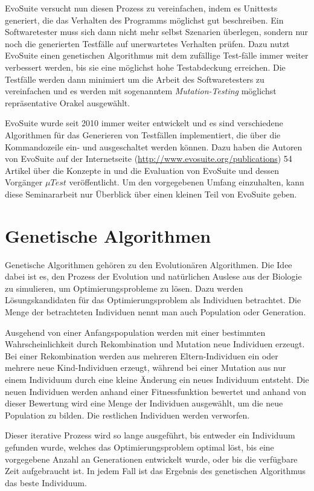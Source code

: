 \documentclass[a4paper,11pt]{article}
\begin{document}
EvoSuite versucht nun diesen Prozess zu vereinfachen, indem es Unittests generiert, die das Verhalten des Programms möglichst gut beschreiben.
Ein Softwaretester muss sich dann nicht mehr selbst Szenarien überlegen, sondern nur noch die generierten Testfälle auf unerwartetes Verhalten prüfen.
Dazu nutzt EvoSuite einen genetischen Algorithmus mit dem zufällige Test-fälle immer weiter verbessert werden, bis sie eine möglichst hohe Testabdeckung erreichen.
Die Testfälle werden dann minimiert um die Arbeit des Softwaretesters zu vereinfachen und es werden mit sogenanntem \textit{Mutation-Testing} möglichst repräsentative Orakel ausgewählt.

EvoSuite wurde seit 2010 immer weiter entwickelt und es sind verschiedene Algorithmen für das Generieren von Testfällen implementiert, die über die Kommandozeile ein- und ausgeschaltet werden können.
Dazu haben die Autoren von EvoSuite auf der Internetseite (\url{http://www.evosuite.org/publications}) 54 Artikel über die Konzepte in und die Evaluation von EvoSuite und dessen Vorgänger ${\mu}Test$ veröffentlicht.
Um den vorgegebenen Umfang einzuhalten, kann diese Seminararbeit nur Überblick über einen kleinen Teil von EvoSuite geben.

\section{Genetische Algorithmen}
\label{sec:genetische_algorithmen}

Genetische Algorithmen gehören zu den Evolutionären Algorithmen.
Die Idee dabei ist es, den Prozess der Evolution und natürlichen Auslese aus der Biologie zu simulieren, um Optimierungsprobleme zu lösen.
Dazu werden Lösungskandidaten für das Optimierungsproblem als Individuen betrachtet.
Die Menge der betrachteten Individuen nennt man auch Population oder Generation.

Ausgehend von einer Anfangspopulation werden mit einer bestimmten Wahrscheinlichkeit durch Rekombination und Mutation neue Individuen erzeugt.
Bei einer Rekombination werden aus mehreren Eltern-Individuen ein oder mehrere neue Kind-Individuen erzeugt, während bei einer Mutation aus nur einem Individuum durch eine kleine Änderung ein neues Individuum entsteht.
Die neuen Individuen werden anhand einer Fitnessfunktion bewertet und anhand von dieser Bewertung wird eine Menge der Individuen ausgewählt, um die neue Population zu bilden.
Die restlichen Individuen werden verworfen.

Dieser iterative Prozess wird so lange ausgeführt, bis entweder ein Individuum gefunden wurde, welches das Optimierungsproblem optimal löst, bis eine vorgegebene Anzahl an Generationen entwickelt wurde, oder bis die verfügbare Zeit aufgebraucht ist.
In jedem Fall ist das Ergebnis des genetischen Algorithmus das beste Individuum.
\end{document}
